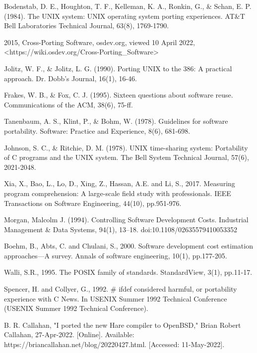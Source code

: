 \begin{flushleft}
\begin{thebibliography}{99}
    Bodenstab, D. E., Houghton, T. F., Kelleman, K. A., Ronkin, G., \& Schan, E. P. (1984).
    The UNIX system: UNIX operating system porting experiences.
    AT\&T Bell Laboratories Technical Journal, 63(8), 1769-1790.

    2015,
    Cross-Porting Software,
    osdev.org,
    viewed 10 April 2022,
    <https://wiki.osdev.org/Cross-Porting\_Software>

    Jolitz, W. F., \& Jolitz, L. G. (1990).
    Porting UNIX to the 386: A practical approach.
    Dr. Dobb's Journal, 16(1), 16-46.

    Frakes, W. B., \& Fox, C. J. (1995).
    Sixteen questions about software reuse.
    Communications of the ACM, 38(6), 75-ff.

    Tanenbaum, A. S., Klint, P., \& Bohm, W. (1978).
    Guidelines for software portability.
    Software: Practice and Experience, 8(6), 681-698.

    Johnson, S. C., \& Ritchie, D. M. (1978).
    UNIX time-sharing system: Portability of C programs and the UNIX system.
    The Bell System Technical Journal, 57(6), 2021-2048.

    Xia, X., Bao, L., Lo, D., Xing, Z., Hassan, A.E. and Li, S., 2017.
    Measuring program comprehension: A large-scale field study with professionals.
    IEEE Transactions on Software Engineering, 44(10), pp.951-976.

    Morgan, Malcolm J. (1994).
    Controlling Software Development Costs.
    Industrial Management \& Data Systems, 94(1), 13–18. doi:10.1108/02635579410053352

    Boehm, B., Abts, C. and Chulani, S., 2000.
    Software development cost estimation approaches—A survey.
    Annals of software engineering, 10(1), pp.177-205.

    Walli, S.R., 1995.
    The POSIX family of standards. StandardView, 3(1), pp.11-17.

    Spencer, H. and Collyer, G., 1992.
    \# ifdef considered harmful, or portability experience with C News.
    In USENIX Summer 1992 Technical Conference (USENIX Summer 1992 Technical Conference).

    B. R. Callahan,
    "I ported the new Hare compiler to OpenBSD,"
    Brian Robert Callahan, 27-Apr-2022. [Online].
    Available: https://briancallahan.net/blog/20220427.html. [Accessed: 11-May-2022].

    \end{thebibliography}
\end{flushleft}
